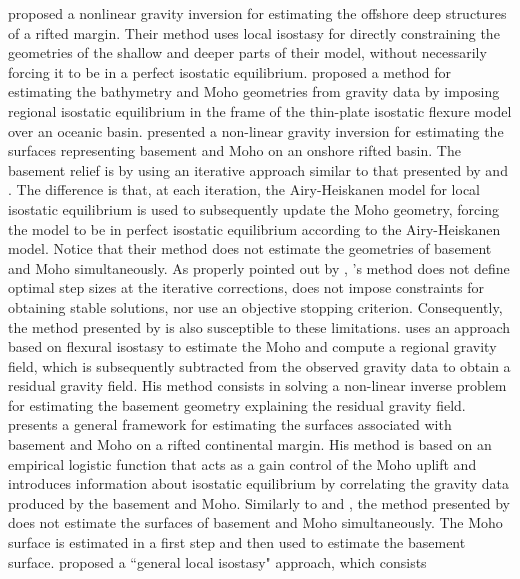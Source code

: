 \documentclass[manuscript,revised]{geophysics}
\begin{document}
\citet{condi-etal1999} proposed a nonlinear gravity inversion for estimating the
offshore deep structures of a rifted margin.
Their method uses local isostasy for directly constraining the 
geometries of the shallow and deeper parts of their model, without necessarily
forcing it to be in a perfect isostatic equilibrium.
\citet{braitenberg-etal2003} proposed a method for estimating the 
bathymetry and Moho geometries from gravity data by imposing regional isostatic
equilibrium in the frame of the thin-plate isostatic flexure model over an
oceanic basin.
\citet{salem-etal2014} presented a non-linear gravity inversion for estimating the 
surfaces representing basement and Moho on an onshore rifted basin. 
The basement relief is by using an iterative approach similar to that
presented by \citet{bott1960} and \citet{cordell-henderson1968}. 
The difference is that, at each iteration, the Airy-Heiskanen model
\citep[][$\,$ p. 135]{heiskanen-moritz1967} for local isostatic equilibrium is used 
to subsequently update the Moho geometry, forcing the model to be in
perfect isostatic equilibrium according to the Airy-Heiskanen model.
Notice that their method does not estimate the geometries of basement and Moho 
simultaneously.
As properly pointed out by \citet{silva-etal2014}, \citeauthor{bott1960}'s
method does not define optimal step sizes at the iterative corrections,
does not impose constraints for obtaining stable solutions, nor use
an objective stopping criterion. 
Consequently, the method presented by \citet{salem-etal2014} is also susceptible 
to these limitations.
\citet{garcia-abdeslem2017} uses an approach based on flexural isostasy 
to estimate the Moho and compute a regional gravity field, which is subsequently 
subtracted from the observed gravity data to obtain a residual gravity field. 
His method consists in solving a non-linear inverse problem for estimating the
basement geometry explaining the residual gravity field.
\citet{salem2017} presents a general framework for estimating the surfaces 
associated with basement and Moho on a rifted continental margin.
His method is based on an empirical logistic function that acts as a gain 
control of the Moho uplift and introduces information about isostatic equilibrium 
by correlating the gravity data produced by the basement and Moho.
Similarly to \citet{salem-etal2014} and \citet{garcia-abdeslem2017}, the method presented
by \citet{salem2017} does not estimate the surfaces of basement and Moho simultaneously.
The Moho surface is estimated in a first step and then used to estimate the basement surface.
\citet{ferderer-etal2017} proposed a ``general local isostasy" approach, which consists
\end{document}
